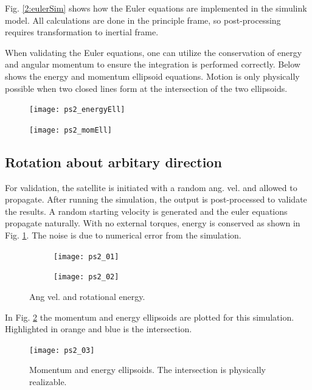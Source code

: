 \documentclass[12pt, letterpaper]{article}
\begin{document}
Fig. \ref{2:eulerSim} shows how the Euler equations are implemented in the simulink model. All calculations are done in the principle frame, so post-processing requires transformation to inertial frame. 

When validating the Euler equations, one can utilize the conservation of energy and angular momentum to ensure the integration is performed correctly. Below shows the energy and momentum ellipsoid equations. Motion is only physically possible when two closed lines form at the intersection of the two ellipsoids.

\begin{figure}[H]
	\centering
	\texttt{[image: ps2\_energyEll]}
\end{figure}


\begin{figure}[H]
	\centering
	\texttt{[image: ps2\_momEll]}
\end{figure}


\subsection{Rotation about arbitary direction}

For validation, the satellite is initiated with a random ang. vel. and allowed to propagate. After running the simulation, the output is post-processed to validate the results. A random starting velocity is generated and the euler equations propagate naturally. With no external torques, energy is conserved as shown in Fig. \ref{(2:angVelEnergy)}. The noise is due to numerical error from the simulation.

\begin{figure}[H]
	\centering
	\begin{subfigure}[b]{0.49\textwidth}
		\texttt{[image: ps2\_01]}
	\end{subfigure}
	\begin{subfigure}[b]{0.49\textwidth}
		\texttt{[image: ps2\_02]}
	\end{subfigure}
	\caption{Ang vel. and rotational energy.}
	\label{(2:angVelEnergy)}
\end{figure}

In Fig. \ref{2:ellipsoids} the momentum and energy ellipsoids are plotted for this simulation. Highlighted in orange and blue is the intersection. 

\begin{figure}[H]
	\centering
	\texttt{[image: ps2\_03]}
	\caption{Momentum and energy ellipsoids. The intersection is physically realizable.}
	\label{2:ellipsoids}
\end{figure}
\end{document}
